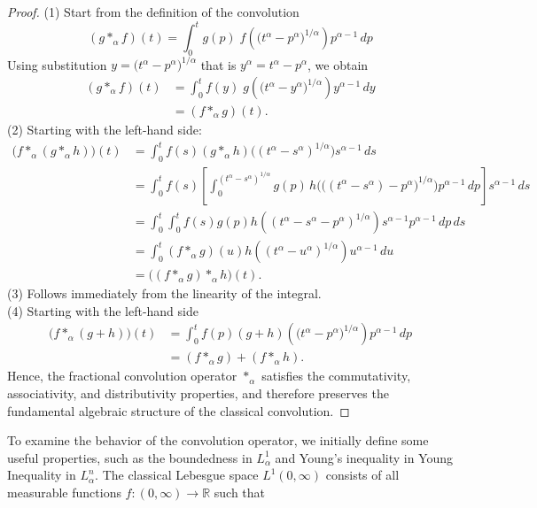 \documentclass[two side,reqno,12pt]{amsart}
\numberwithin{equation}{section}
\theoremstyle{definition}
\begin{document}
\begin{proof}
(1) Start from the definition of the convolution
\[
(g *_{\alpha} f)(t) = \int_{0}^{t} g(p) \; f\!\left(\big( t^{\alpha} - p^{\alpha}\big)^{1/\alpha} \right) p^{\alpha-1} \, dp 
\]
Using substitution
$
y = \big( t^{\alpha} - p^{\alpha}\big)^{1/\alpha} 
$
that is 
$
y^{\alpha} = t^{\alpha} - p^{\alpha}
$, we obtain
\begin{align*}
    (g *_{\alpha} f)(t) 
    &= \int_{0}^{t} f(y) \; g\!\left(\big( t^{\alpha} - y^{\alpha}\big)^{1/\alpha} \right) y^{\alpha-1} \, dy\\
    &=(f *_{\alpha} g)(t).
\end{align*}
(2) Starting with the left-hand side:
\begin{align*}
    \big(f *_\alpha (g *_\alpha h)\big)(t) 
    &= \int_0^t f(s) (g *_\alpha h)\big((t^\alpha - s^\alpha)^{1/\alpha}\big) s^{\alpha-1} \, ds\\
    &= \int_0^t f(s) \left[ \int_0^{(t^\alpha - s^\alpha)^{1/\alpha}} g(p) \, h\Big(\big((t^\alpha - s^\alpha) - p^\alpha\big)^{1/\alpha}\Big) p^{\alpha-1} \, dp \right] s^{\alpha-1} \, ds\\
    &=\int_0^t \int_0^t f(s)g(p)h((t^\alpha-s^\alpha-p^\alpha)^{1/\alpha})s^{\alpha-1}p^{\alpha-1}\,dp\,ds\\
    &=\int_0^t (f*_\alpha g)(u)h((t^\alpha-u^\alpha)^{1/\alpha})u^{\alpha-1}\,du\\
    &=\big((f *_\alpha g) *_\alpha h\big)(t).
    \end{align*}
(3) Follows immediately from the linearity of the integral.
\\(4) Starting with the left-hand side
\begin{align*}
   \big(f*_\alpha (g+h)\big)(t)
   &=\int_0^t f(p)(g+h)\!\left( \big( t^{\alpha} - p^{\alpha}\big)^{1/\alpha} \right) p^{\alpha-1} \, dp\\
   &= (f *_{\alpha} g) + (f *_{\alpha} h).
\end{align*}
Hence, the fractional convolution operator \( *_\alpha \) satisfies the commutativity, associativity, and distributivity properties, and therefore preserves the fundamental algebraic structure of the classical convolution.
\end{proof}
To examine the behavior of the convolution operator, we initially define some useful properties, such as the boundedness in $L^1_\alpha$ and Young’s inequality in Young Inequality in $L^n_\alpha$.
The classical Lebesgue space $L^1(0,\infty)$ consists of all measurable functions $f:(0,\infty)\to \mathbb{R}$ such that
\end{document}
